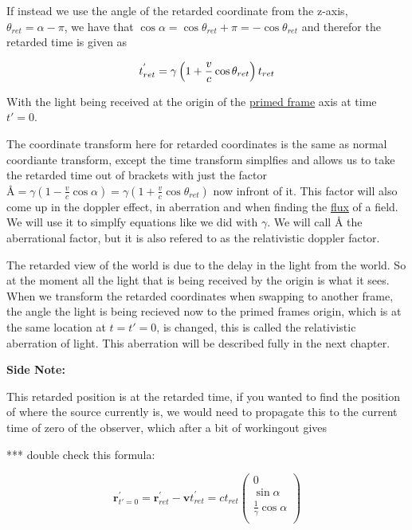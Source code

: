 If instead we use the angle of the retarded coordinate from the z-axis, $\theta_{ret} = \alpha - \pi$, we have that $\cos{\alpha}=\cos{\theta_{ret}+\pi}=-\cos{\theta_{ret}}$ and therefor the retarded time is given as

\begin{equation}
	\\ {{t}_{ret}^{'}} = {\gamma} \left(1 + \frac{v}{c} \cos{\theta_{ret}} \right) {{{t}_{ret}}}
\end{equation}

With the light being received at the origin of the \hyperlink{def-Primed-Frame}{primed frame} axis at time ${t{'}} = 0$.

The coordinate transform here for retarded coordinates is the same as normal coordiante transform, except the time transform simplfies and allows us to take the retarded time out of brackets with just the factor $\text{\AA}={\gamma} \left(1-\frac{v}{c} \cos{\alpha} \right) = {\gamma} \left(1 + \frac{v}{c} \cos{\theta_{ret}} \right)$ now infront of it.
This factor will also come up in the doppler effect, in aberration and when finding the \hyperlink{def-flux}{flux} of a field.
We will use it to simplfy equations like we did with $\gamma$.
We will call $\text{\AA}$ the aberrational factor, but it is also refered to as the relativistic doppler factor.

The retarded view of the world is due to the delay in the light from the world.
So at the moment all the light that is being received by the origin is what it sees.
When we transform the retarded coordinates when swapping to another frame, the angle the light is being recieved now to the primed frames origin, which is at the same location at ${t}={t{'}}=0$, is changed, this is called the relativistic aberration of light.
This aberration will be described fully in the next chapter.

\textbf{Side Note:}

This retarded position is at the retarded time, if you wanted to find the position of where the source currently is, we would need to propagate this to the current time of zero of the observer, which after a bit of workingout gives

*** double check this formula:

\begin{equation}
	\label{eq: primed position with synced times}
	\mathbf{r}_{{t{'}} = 0}^{'} = \mathbf{r}_{ret}^{'}-\mathbf{v}t_{ret}^{'} = {c}{{t}_{ret}}
	\begin{pmatrix}
		0                               \\
		\sin{\alpha}                    \\
		\frac{1}{{\gamma}} \cos{\alpha} \\
	\end{pmatrix}
\end{equation}

